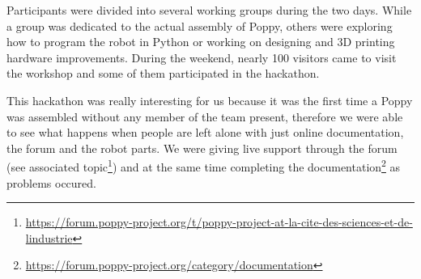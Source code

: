 Participants were divided into several working groups during the two days. While a group was dedicated to the actual assembly of Poppy, others were exploring how to program the robot in Python or working on designing and 3D printing hardware improvements. During the weekend, nearly 100 visitors came to visit the workshop and some of them participated in the hackathon.

This hackathon was really interesting for us because it was the first time a Poppy was assembled without any member of the team present, therefore we were able to see what happens when people are left alone with just online documentation, the forum and the robot parts.
We were giving live support through the forum (see associated topic\footnote{\url{https://forum.poppy-project.org/t/poppy-project-at-la-cite-des-sciences-et-de-lindustrie}}) and at the same time completing the documentation\footnote{\url{https://forum.poppy-project.org/category/documentation}} as problems occured.

\begin{figure}[p]
\centering
    \hfil
    \hfil
    \newline
    \hfil
    \newline
    \hfil
    \newline
    \hfil
    \caption{}
    \label{fig:universience_workshop}
\end{figure}

